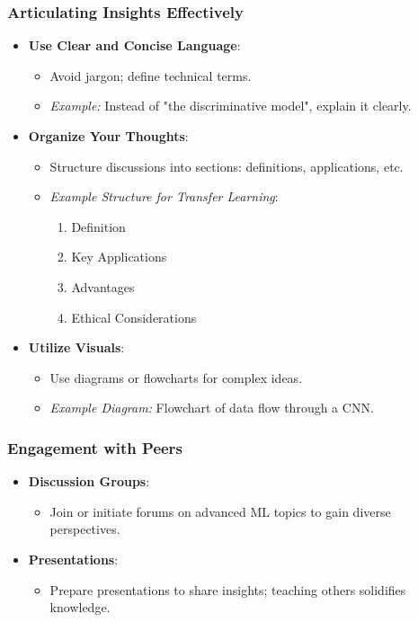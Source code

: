 \documentclass[aspectratio=169]{beamer}
\begin{document}
\begin{frame}[fragile]
    \frametitle{Articulating Insights Effectively}
    \begin{itemize}
        \item \textbf{Use Clear and Concise Language}:
            \begin{itemize}
                \item Avoid jargon; define technical terms.
                \item \textit{Example:} Instead of "the discriminative model", explain it clearly.
            \end{itemize}
        
        \item \textbf{Organize Your Thoughts}:
            \begin{itemize}
                \item Structure discussions into sections: definitions, applications, etc.
                \item \textit{Example Structure for Transfer Learning}:
                    \begin{enumerate}
                        \item Definition
                        \item Key Applications
                        \item Advantages
                        \item Ethical Considerations
                    \end{enumerate}
            \end{itemize}
        
        \item \textbf{Utilize Visuals}:
            \begin{itemize}
                \item Use diagrams or flowcharts for complex ideas.
                \item \textit{Example Diagram:} Flowchart of data flow through a CNN.
            \end{itemize}
    \end{itemize}
\end{frame}

\begin{frame}[fragile]
    \frametitle{Engagement with Peers}
    \begin{itemize}
        \item \textbf{Discussion Groups}:
            \begin{itemize}
                \item Join or initiate forums on advanced ML topics to gain diverse perspectives.
            \end{itemize}
        
        \item \textbf{Presentations}:
            \begin{itemize}
                \item Prepare presentations to share insights; teaching others solidifies knowledge.
            \end{itemize}
    \end{itemize}
\end{frame}
\end{document}
